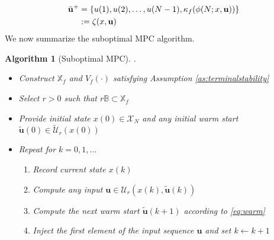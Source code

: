 \documentclass{article}
\newtheorem{algorithm}{Algorithm}
\begin{document}
\begin{align}
\tilde{\mathbf{u}}^+ 
&=
\{u(1),u(2),\dots,u(N-1),\kappa_f(\phi(N;x,\mathbf{u}))\}  \notag  \\
&:= \zeta(x,\mathbf{u}) \label{eq:warm}
\end{align}
We now summarize the suboptimal MPC algorithm. 
\begin{algorithm}[Suboptimal MPC] .\\
\label{alg:suboptimal}
\begin{itemize}
\item Construct $\mathbb{X}_f$ and $V_f(\cdot)$ satisfying Assumption \ref{as:terminalstability}
\item Select $r > 0$ such that $r\mathbb{B} \subset \mathbb{X}_f$
\item Provide initial state $x(0) \in \mathcal{X}_N$ 
and any initial warm start $\tilde{\mathbf{u}}(0) \in \tilde{\mathcal{U}}_r(x(0))$
\item Repeat for $k = 0,1,\dots$
\begin{enumerate}
\item Record current state $x(k)$
\item Compute any input $\mathbf{u} \in \mathcal{U}_r(x(k),\tilde{\mathbf{u}}(k))$
\item Compute the next warm start $\tilde{\mathbf{u}}(k+1)$ according to \eqref{eq:warm}
\item Inject the first element of the input sequence $\mathbf{u}$ and set $k \leftarrow k+1$  
\end{enumerate}
\end{itemize}
\end{algorithm}
\end{document}

